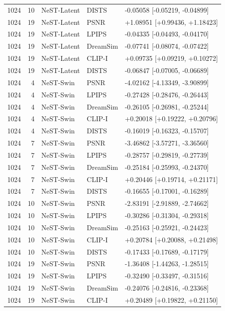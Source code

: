 \documentclass[10pt,letterpaper]{article}
\begin{document}
\begin{longtable}{@{}rrlll@{}}
1024 & 10 & NeST-Latent & DISTS & -0.05058 [-0.05219, -0.04899]\\
1024 & 19 & NeST-Latent & PSNR & +1.08951 [+0.99436, +1.18423]\\
1024 & 19 & NeST-Latent & LPIPS & -0.04335 [-0.04493, -0.04170]\\
1024 & 19 & NeST-Latent & DreamSim & -0.07741 [-0.08074, -0.07422]\\
1024 & 19 & NeST-Latent & CLIP-I & +0.09735 [+0.09219, +0.10272]\\
1024 & 19 & NeST-Latent & DISTS & -0.06847 [-0.07005, -0.06689]\\
1024 & 4 & NeST-Swin & PSNR & -4.02162 [-4.13349, -3.90899]\\
1024 & 4 & NeST-Swin & LPIPS & -0.27428 [-0.28476, -0.26443]\\
1024 & 4 & NeST-Swin & DreamSim & -0.26105 [-0.26981, -0.25244]\\
1024 & 4 & NeST-Swin & CLIP-I & +0.20018 [+0.19222, +0.20796]\\
1024 & 4 & NeST-Swin & DISTS & -0.16019 [-0.16323, -0.15707]\\
1024 & 7 & NeST-Swin & PSNR & -3.46862 [-3.57271, -3.36560]\\
1024 & 7 & NeST-Swin & LPIPS & -0.28757 [-0.29819, -0.27739]\\
1024 & 7 & NeST-Swin & DreamSim & -0.25184 [-0.25993, -0.24370]\\
1024 & 7 & NeST-Swin & CLIP-I & +0.20446 [+0.19714, +0.21171]\\
1024 & 7 & NeST-Swin & DISTS & -0.16655 [-0.17001, -0.16289]\\
1024 & 10 & NeST-Swin & PSNR & -2.83191 [-2.91889, -2.74662]\\
1024 & 10 & NeST-Swin & LPIPS & -0.30286 [-0.31304, -0.29318]\\
1024 & 10 & NeST-Swin & DreamSim & -0.25163 [-0.25921, -0.24423]\\
1024 & 10 & NeST-Swin & CLIP-I & +0.20784 [+0.20088, +0.21498]\\
1024 & 10 & NeST-Swin & DISTS & -0.17433 [-0.17689, -0.17179]\\
1024 & 19 & NeST-Swin & PSNR & -1.36408 [-1.44263, -1.28515]\\
1024 & 19 & NeST-Swin & LPIPS & -0.32490 [-0.33497, -0.31516]\\
1024 & 19 & NeST-Swin & DreamSim & -0.24076 [-0.24816, -0.23368]\\
1024 & 19 & NeST-Swin & CLIP-I & +0.20489 [+0.19822, +0.21150]\\

\end{longtable}
\end{document}
